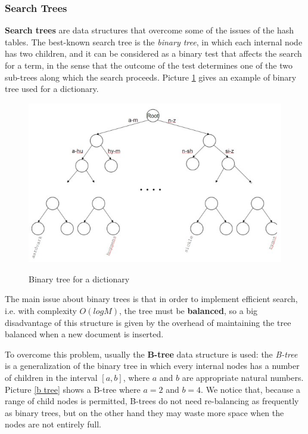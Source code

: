 \subsubsection{Search Trees}
\textbf{Search trees} are data structures that overcome some of the issues of the hash tables. The best-known search tree is the \textit{binary tree}, in which each internal node has two children, and it can be considered as a binary test that affects the search for a term, in the sense that the outcome of the test determines one of the two sub-trees along which the search proceeds. Picture \ref{binary tree} gives an example of binary tree used for a dictionary.

\begin{figure}[h!]
		\centering
		\includegraphics[scale = 1.8]{img/binary tree.jpg}
		\label{binary tree}
        \caption{Binary tree for a dictionary}
\end{figure}

The main issue about binary trees is that in order to implement efficient search, i.e. with complexity $O(logM)$, the tree must be \textbf{balanced}, so a big disadvantage of this structure is given by the overhead of maintaining the tree balanced when a new document is inserted.

To overcome this problem, usually the \textbf{B-tree} data structure is used: the \textit{B-tree} is a generalization of the binary tree in which every internal nodes has a number of children in the interval $[a,b]$, where $a$ and $b$ are appropriate natural numbers. Picture \ref{b tree} shows a B-tree where $a = 2$ and $b = 4$. We notice that, because a range of child nodes is permitted, B-trees do not need re-balancing as frequently as binary trees, but on the other hand they may waste more space when the nodes are not entirely full.

